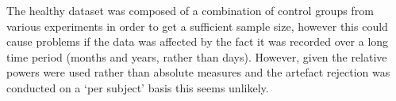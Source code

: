 The healthy dataset was composed of a combination of control groups from various experiments in order to get a sufficient sample size, however this could cause problems if the data was affected by the fact it was recorded over a long time period (months and years, rather than days). However, given the relative powers were used rather than absolute measures and the artefact rejection was conducted on a `per subject' basis this seems unlikely.



